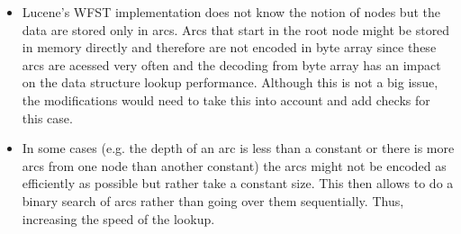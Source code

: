 \begin{itemize}
\begin{figure}[htbp]
        \caption{Comparison of memory usage when changing number encoding}
        \label{enc_comp}
    \end{figure}

    The memory usage increased by approximately $22\%$ for \textit{English words} dataset. However, it can be
    almost doubled as can be seen on \textit{Linux kernel} dataset where approximately $92\%$ size increase can be noticed.
    The graph \ref{enc_comp} also shows the case when the encoding would use \textit{long} datatype. Although Lucene's \textit{Lookup}
    interface specificies \textit{long} datatype, WFST implementation supports only \textit{int} so far.

    \item Lucene's WFST implementation does not know the notion of nodes but the data are stored only in arcs. Arcs that
    start in the root node might be stored in memory directly and therefore are not encoded in byte array since these
    arcs are acessed very often
    and the decoding from byte array has an impact on the data structure lookup performance. Although this is not a big issue,
    the modifications would need to take this into account and add checks for this case.

    \item In some cases (e.g. the depth of an arc is less than a constant or there is more arcs from one node than
    another constant) the arcs
    might not be encoded as efficiently as possible but rather take a constant size. This then allows to do a binary
    search of arcs rather than going over them sequentially. Thus, increasing the speed of the lookup.


\end{itemize}
